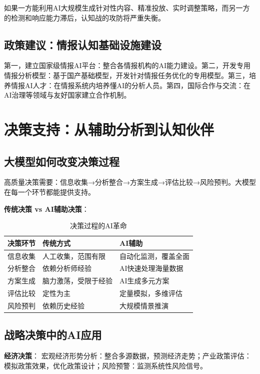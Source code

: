 如果一方能利用AI大规模生成针对性内容、精准投放、实时调整策略，而另一方的检测和响应能力滞后，认知战的攻防将严重失衡。

\subsection{政策建议：情报认知基础设施建设}
第一，建立国家级情报AI平台：整合各情报机构的AI能力建设。第二，开发专用情报分析模型：基于国产基础模型，开发针对情报任务优化的专用模型。第三，培养情报AI人才：在情报系统内培养懂AI的分析人员。第四，国际合作与交流：在AI治理等领域与友好国家建立合作机制。

\section{决策支持：从辅助分析到认知伙伴}

\subsection{大模型如何改变决策过程}

高质量决策需要：信息收集→分析整合→方案生成→评估比较→风险预判。大模型在每一个环节都能提供支持。

\textbf{传统决策 vs AI辅助决策}：

\begin{table}[H]
\centering
\caption{决策过程的AI革命}
\small
\begin{tabular}{p{2.5cm}p{4.5cm}p{4.5cm}}
\toprule
\textbf{决策环节} & \textbf{传统方式} & \textbf{AI辅助} \\
\midrule
信息收集 & 人工收集，范围有限 & 自动化监测，覆盖全面 \\
分析整合 & 依赖分析师经验 & AI快速处理海量数据 \\
方案生成 & 脑力激荡，受限于经验 & AI生成多元方案 \\
评估比较 & 定性为主 & 定量模拟，多维评估 \\
风险预判 & 依赖历史经验 & 大规模情景推演 \\
\bottomrule
\end{tabular}
\end{table}

\subsection{战略决策中的AI应用}

\textbf{经济决策}：
宏观经济形势分析：整合多源数据，预测经济走势；产业政策评估：模拟政策效果，优化政策设计；风险预警：监测系统性风险信号。

